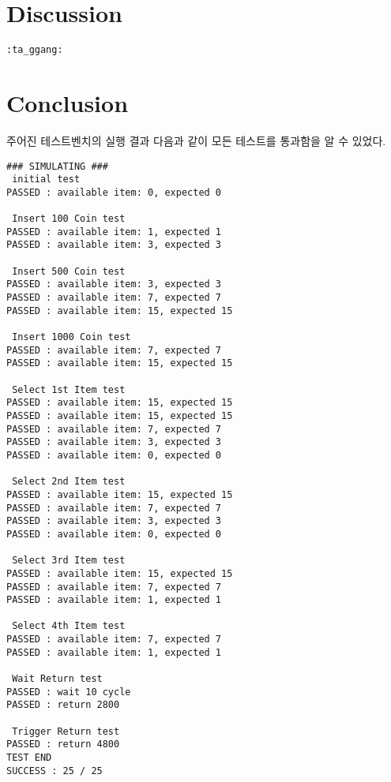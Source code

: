 \documentclass{scrartcl}
\begin{document}
\section{Discussion}
\texttt{:ta\_ggang:} %

\section{Conclusion}
주어진 테스트벤치의 실행 결과 다음과 같이 모든 테스트를 통과함을 알 수 있었다.

\begin{lstlisting}
### SIMULATING ###
 initial test
PASSED : available item: 0, expected 0

 Insert 100 Coin test
PASSED : available item: 1, expected 1
PASSED : available item: 3, expected 3

 Insert 500 Coin test
PASSED : available item: 3, expected 3
PASSED : available item: 7, expected 7
PASSED : available item: 15, expected 15

 Insert 1000 Coin test
PASSED : available item: 7, expected 7
PASSED : available item: 15, expected 15

 Select 1st Item test
PASSED : available item: 15, expected 15
PASSED : available item: 15, expected 15
PASSED : available item: 7, expected 7
PASSED : available item: 3, expected 3
PASSED : available item: 0, expected 0

 Select 2nd Item test
PASSED : available item: 15, expected 15
PASSED : available item: 7, expected 7
PASSED : available item: 3, expected 3
PASSED : available item: 0, expected 0

 Select 3rd Item test
PASSED : available item: 15, expected 15
PASSED : available item: 7, expected 7
PASSED : available item: 1, expected 1

 Select 4th Item test
PASSED : available item: 7, expected 7
PASSED : available item: 1, expected 1

 Wait Return test
PASSED : wait 10 cycle
PASSED : return 2800

 Trigger Return test
PASSED : return 4800
TEST END
SUCCESS : 25 / 25
\end{lstlisting}
\end{document}
